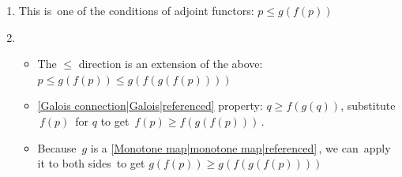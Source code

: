 \begin{enumerate}
    \item  This is \,one of the conditions of adjoint functors: $p \leq g(f(p))$\,
    \item \begin{itemize}
            \item The $\leq$ direction is an extension of the above: \,$p \leq g(f(p)) \leq g(f(g(f(p))))$\,
            \item \ref{Galois connection|Galois|referenced} property: $q  \geq f(g(q))$, substitute \,$f(p)$\, for $q$ to get \,$f(p) \geq f(g(f(p)))$\,.
            \item Because \,$g$ is a \ref{Monotone map|monotone map|referenced}\,, we can \,apply it to both sides\, to get $g(f(p)) \geq g(f(g(f(p))))$
          \end{itemize}
  \end{enumerate}